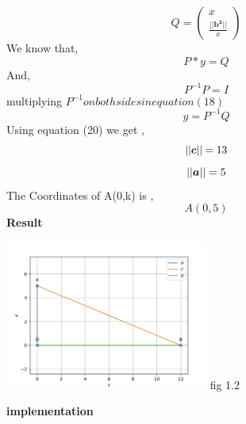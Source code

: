 \documentclass[10pt,a4paper]{report}
\begin{document}
\begin{multicols}{2}
\begin{equation}
  Q = \begin{pmatrix}
x\\
\frac{ ||\boldsymbol{b^2}||}{x}
\end{pmatrix} 
\end{equation}\vspace{2mm}
We know that,\\
\begin{equation}
P * y = Q
\end{equation}
And,\\
\begin{equation}
P^{-1} P = I
\end{equation}
multiplying $P^{-1} on both sides in equation (18)$\\
\begin{equation}
 y = P^{-1} Q
\end{equation}
Using equation (20) we get ,
\begin{equation}
    ||\boldsymbol{c}|| = 13 \vspace{2mm}
\end{equation}
\begin{equation}
  ||\boldsymbol{a}|| = 5 \vspace{2mm}
\end{equation}
The Coordinates of A(0,k) is ,
\begin{equation}
  A(0,5)
\end{equation}
\textbf{Result} 
\begin{center}
 \includegraphics[width=0.5\textwidth]{matrix.jpg}  
 fig 1.2   \vspace{2mm}\\
 \end{center}\vspace{5mm}
 \vspace{2mm}  
\textbf{implementation}
\begin{center}
\setlength{\arrayrulewidth}{0.5mm}
\setlength{\tabcolsep}{5pt}
\renewcommand{\arraystretch}{3}
    \begin{tabular}{|l|c|}

\end{tabular}
\end{center}
\end{multicols}
\end{document}
